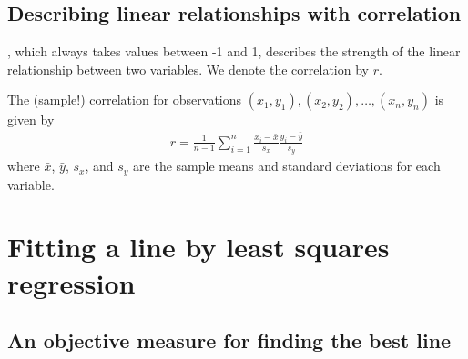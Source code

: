 \subsection{Describing linear relationships with correlation}

\begin{termBox}{
, which always takes values between -1 and 1, describes the strength of the linear relationship between two variables. We denote the correlation by $r$.}
\end{termBox}

The (sample!) correlation for observations $(x_1, y_1), (x_2, y_2), \dots, (x_n, y_n)$ is given by
\begin{eqnarray*}
r = \frac{1}{n-1}\sum_{i=1}^{n} \frac{x_i-\bar{x}}{s_x}\frac{y_i-\bar{y}}{s_y}
\end{eqnarray*}
where $\bar{x}$, $\bar{y}$, $s_x$, and $s_y$ are the sample means and standard deviations for each variable.


\section{Fitting a line by least squares regression}
\label{fittingALineByLSR}



\subsection{An objective measure for finding the best line}


